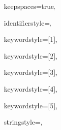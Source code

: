 {%
keepspaces=true,

identifierstyle={\ttfamily\color{black}},

keywordstyle=[1]{\ttfamily\color{dkviolet}},

keywordstyle=[2]{\ttfamily\color{dkgreen}},

keywordstyle=[3]{\ttfamily\color{lightblue}},

keywordstyle=[4]{\ttfamily\color{dkblue}},

keywordstyle=[5]{\ttfamily\color{red}},



stringstyle=\ttfamily,


}
